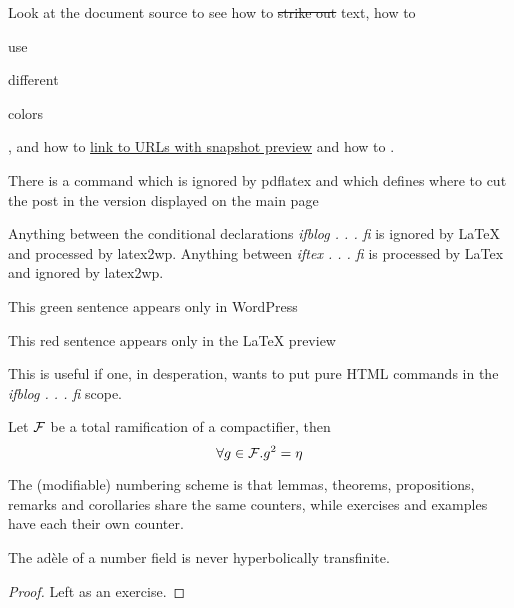 

Look at the document source to see how to \sout{strike out} text, how
to \begin{red}use\end{red} \begin{green}different\end{green} \begin{blue}colors\end{blue},
and how to \href{http://www.google.com}{link to URLs with snapshot preview}
and how to .


There is a command which is ignored by pdflatex and which 
defines where to cut the post in the version displayed on the
main page\more

Anything between the conditional declarations {\em ifblog . . . fi}
is ignored by LaTeX and processed by latex2wp. Anything
between {\em iftex . . . fi} is processed by LaTex and ignored
by latex2wp.

\ifblog \begin{green}This green sentence appears only in WordPress \end{green} \fi

\iftex \begin{red}This red sentence appears only in the LaTeX preview \end{red} \fi

This is useful if one, in desperation, wants to put pure HTML commands
in the {\em ifblog . . . fi} scope.


\begin{lemma}[Main] \label{lm:main}
Let $\cal F$ be a total ramification of a compactifier, then
\begin{equation} \label{eq:lemma} \forall g \in {\cal F}. g^2 = \eta \end{equation}
\end{lemma}

The  (modifiable) numbering scheme is that lemmas, theorems, 
propositions, remarks and corollaries share the same counters,
while exercises and examples have each their own counter.

\begin{theorem} \label{th:ad} The ad\`ele of a number field is never
hyperbolically transfinite.
\end{theorem}

\begin{proof} Left as an exercise. \end{proof}

